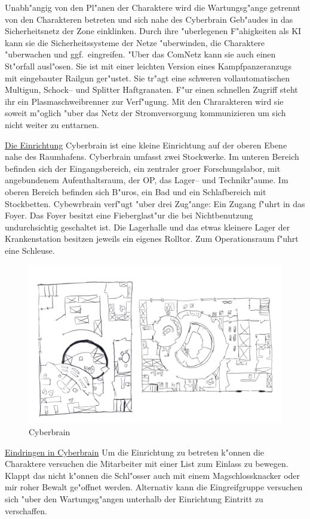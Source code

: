 \underline{\xl} Unabh"angig von den Pl"anen der Charaktere wird \xl{} die Wartungsg"ange getrennt von den Charakteren betreten und sich nahe des Cyberbrain Geb"audes in das Sicherheitsnetz der Zone einklinken. Durch ihre "uberlegenen F"ahigkeiten als KI kann sie die Sicherheitssysteme der Netze "uberwinden, die Charaktere "uberwachen und ggf.~eingreifen. "Uber das ComNetz kann sie auch einen St"orfall ausl"osen. Sie ist mit einer leichten Version eines Kampfpanzeranzugs mit eingebauter Railgun ger"ustet. Sie tr"agt eine schweren vollautomatischen Multigun, Schock-- und Splitter Haftgranaten. F"ur einen schnellen Zugriff steht ihr ein Plasmaschwei\3brenner zur Verf"ugung. Mit den Chrarakteren wird sie soweit m"oglich "uber das Netz der Stromversorgung kommunizieren um sich nicht weiter zu enttarnen.

\underline{Die Einrichtung} Cyberbrain ist eine kleine Einrichtung auf der oberen Ebene nahe des Raumhafens. Cyberbrain umfasst zwei Stockwerke. Im unteren Bereich befinden sich der Eingangsbereich, ein zentraler gro\3er Forschungslabor, mit angebundenem Aufenthaltsraum, der OP, das Lager-- und Technikr"aume. Im oberen Bereich befinden sich B"uros, ein Bad und ein Schlafbereich mit Stockbetten. Cybewrbrain verf"ugt "uber drei Zug"ange: Ein Zugang f"uhrt in das Foyer. Das Foyer besitzt eine Fieberglast"ur die bei Nichtbenutzung undurchsichtig geschaltet ist. Die Lagerhalle und das etwas kleinere Lager der Krankenstation besitzen jeweils ein eigenes Rolltor. Zum Operationsraum f"uhrt eine Schleuse.

\begin{figure}
    \includegraphics[width=0.9\linewidth]{./images/cyberbrain.png}
    \caption{Cyberbrain}
\end{figure}

\underline{Eindringen in Cyberbrain} Um die Einrichtung zu betreten k"onnen die Charaktere versuchen die Mitarbeiter mit einer List zum Einlass zu bewegen. Klappt das nicht k"onnen die Schl"osser auch mit einem Magschlossknacker oder mir roher Bewalt ge"offnet werden. Alternativ kann die Eingreifgruppe versuchen sich "uber den Wartungsg"angen unterhalb der Einrichtung Eintritt zu verschaffen.

